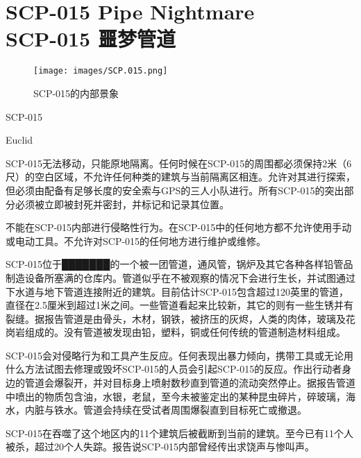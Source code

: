 \chapter[SCP-015 噩梦管道]{
    SCP-015 Pipe Nightmare\\
    SCP-015 噩梦管道
}

\label{chap:SCP-015}

\begin{figure}[H]
    \centering
    \texttt{[image: images/SCP.015.png]}
    \caption*{SCP-015的内部景象}
\end{figure}

SCP-015

Euclid

SCP-015无法移动，只能原地隔离。任何时候在SCP-015的周围都必须保持2米（6尺）的空白区域，不允许任何种类的建筑与当前隔离区相连。允许对其进行探索，但必须由配备有足够长度的安全索与GPS的三人小队进行。所有SCP-015的突出部分必须被立即被封死并密封，并标记和记录其位置。

不能在SCP-015内部进行侵略性行为。在SCP-015中的任何地方都不允许使用手动或电动工具。不允许对SCP-015的任何地方进行维护或维修。

SCP-015位于███████的一个被一团管道，通风管，锅炉及其它各种各样铅管品制造设备所塞满的仓库内。管道似乎在不被观察的情况下会进行生长，并试图通过下水道与地下管道连接附近的建筑。目前估计SCP-015包含超过120英里的管道，直径在2.5厘米到超过1米之间。一些管道看起来比较新，其它的则有一些生锈并有裂缝。据报告管道是由骨头，木材，钢铁，被挤压的灰烬，人类的肉体，玻璃及花岗岩组成的。没有管道被发现由铅，塑料，铜或任何传统的管道制造材料组成。

SCP-015会对侵略行为和工具产生反应。任何表现出暴力倾向，携带工具或无论用什么方法试图去修理或毁坏SCP-015的人员会引起SCP-015的反应。作出行动者身边的管道会爆裂开，并对目标身上喷射数秒直到管道的流动突然停止。据报告管道中喷出的物质包含油，水银，老鼠，至今未被鉴定出的某种昆虫碎片，碎玻璃，海水，内脏与铁水。管道会持续在受试者周围爆裂直到目标死亡或撤退。

SCP-015在吞噬了这个地区内的11个建筑后被截断到当前的建筑。至今已有11个人被杀，超过20个人失踪。报告说SCP-015内部曾经传出求饶声与惨叫声。

